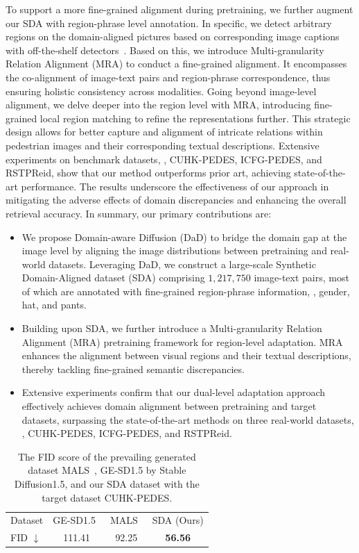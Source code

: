 To support a more fine-grained alignment during pretraining, we further augment our SDA with region-phrase level annotation. 
In specific, we detect arbitrary regions on the domain-aligned pictures based on corresponding image captions with off-the-shelf detectors~\cite{liu2023grounding}.
Based on this, we introduce  Multi-granularity Relation Alignment (MRA) to conduct a fine-grained alignment.
It encompasses the co-alignment of image-text pairs and region-phrase correspondence, thus ensuring holistic consistency across modalities. 
Going beyond image-level alignment, we delve deeper into the region level with MRA, introducing fine-grained local region matching to refine the representations further. 
This strategic design allows for better capture and alignment of intricate relations within pedestrian images and their corresponding textual descriptions. 
Extensive experiments on benchmark datasets, \ie, CUHK-PEDES, ICFG-PEDES, and RSTPReid, show that our method outperforms prior art, achieving state-of-the-art performance. 
The results underscore the effectiveness of our approach in mitigating the adverse effects of domain discrepancies and enhancing the overall retrieval accuracy. 
In summary, our primary contributions are:
\begin{itemize}
    \item We propose Domain-aware Diffusion (DaD) to bridge the domain gap at the image level by aligning the image distributions between pretraining and real-world datasets. Leveraging DaD, we construct a large-scale Synthetic Domain-Aligned dataset (SDA) comprising $1,217,750$ image-text pairs, most of which are annotated with fine-grained region-phrase information, \eg, gender, hat, and pants.
    \item Building upon SDA, we further introduce a Multi-granularity Relation Alignment (MRA) pretraining framework for region-level adaptation. MRA enhances the alignment between visual regions and their textual descriptions, thereby tackling fine-grained semantic discrepancies.
    \item Extensive experiments confirm that our dual-level adaptation approach effectively achieves domain alignment between pretraining and target datasets, surpassing the state-of-the-art methods on three real-world datasets, \ie, CUHK-PEDES, ICFG-PEDES, and RSTPReid. 
\end{itemize}


\begin{table}[!t]
\caption{The FID score of the prevailing generated dataset MALS~\cite{yang2023towards}, GE-SD1.5 by Stable Diffusion1.5, and our SDA dataset with the target dataset CUHK-PEDES. 
}
\label{tab: fid}
\small
\centering
\setlength{\tabcolsep}{7pt}
\begin{tabular}{lccc}
\hline
Dataset & GE-SD1.5~\cite{sd15} & MALS~\cite{yang2023towards}  & SDA (Ours) \\
\shline
FID $\downarrow$  & 111.41   & 92.25  & \textbf{56.56} \\
\hline
\end{tabular}
\end{table}


